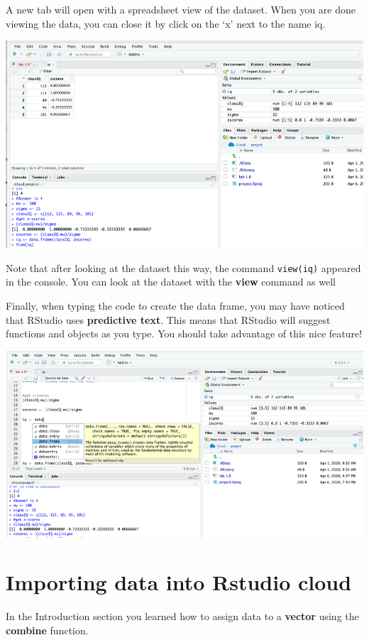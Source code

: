 \documentclass[
]{book}
\begin{document}
A new tab will open with a spreadsheet view of the dataset. When you are done viewing the data, you can close it by click on the `x' next to the name iq.

\includegraphics{img/dataframe2.png}

Note that after looking at the dataset this way, the command \texttt{view(iq)} appeared in the console. You can look at the dataset with the \textbf{view} command as well

Finally, when typing the code to create the data frame, you may have noticed that RStudio uses \textbf{predictive text}. This means that RStudio will suggest functions and objects as you type. You should take advantage of this nice feature!

\includegraphics{img/autofill.png}

\hypertarget{importing-data-into-rstudio-cloud}{%
\section{Importing data into Rstudio cloud}\label{importing-data-into-rstudio-cloud}}

In the Introduction section you learned how to assign data to a \textbf{vector} using the \textbf{combine} function.
\end{document}
